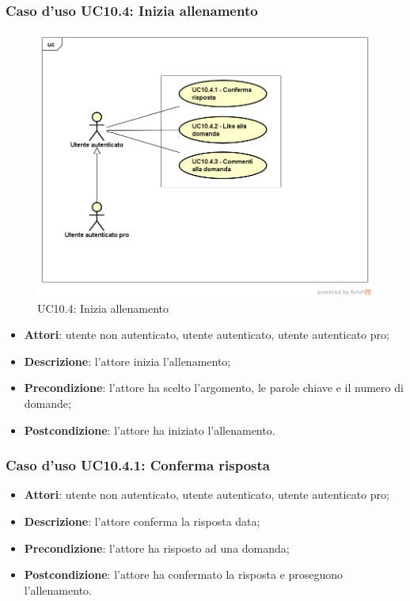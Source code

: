 \subsubsection{Caso d'uso UC10.4: Inizia allenamento}
\label{UC10.4}
\begin{figure}
	\centering
	\includegraphics[scale=0.5]{UML/UC10_4.png}
	\caption{UC10.4: Inizia allenamento}
\end{figure}
\FloatBarrier
	\begin{itemize}
		\item \textbf{Attori}: utente non autenticato, utente autenticato, utente autenticato pro;
		\item \textbf{Descrizione}: l'attore inizia l'allenamento;
		\item \textbf{Precondizione}: l'attore ha scelto l'argomento, le parole chiave e il numero di domande;
		\item \textbf{Postcondizione}: l'attore ha iniziato l'allenamento.
	\end{itemize}
\subsubsection{Caso d'uso UC10.4.1: Conferma risposta}
	\begin{itemize}
		\item \textbf{Attori}: utente non autenticato, utente autenticato, utente autenticato pro;
		\item \textbf{Descrizione}: l'attore conferma la risposta data;
		\item \textbf{Precondizione}: l'attore ha risposto ad una domanda;
		\item \textbf{Postcondizione}: l'attore ha confermato la risposta e proseguono l'allenamento.
	\end{itemize}
